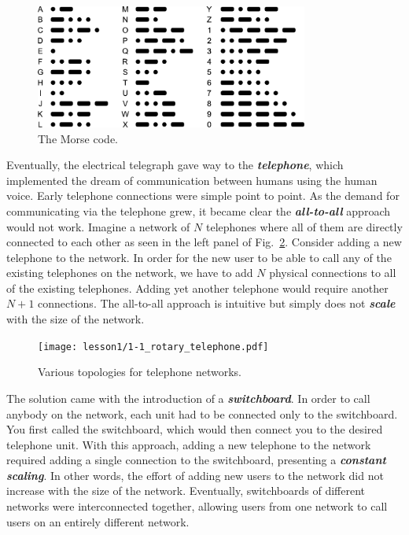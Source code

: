 \begin{figure}[t]
    \centering
    \includegraphics[width=0.8\textwidth]{lesson1/1-1_morse.pdf}
    \caption{The Morse code.}
    \label{fig:1-1_morse}
\end{figure}

Eventually, the electrical telegraph gave way to the \textit{\textbf{telephone}}, which implemented the dream of communication between humans using the human voice.
Early telephone connections were simple point to point.
As the demand for communicating via the telephone grew, it became clear the \textit{\textbf{all-to-all}} approach would not work.
Imagine a network of $N$ telephones where all of them are directly connected to each other as seen in the left panel of Fig.~\ref{fig:1-1_telephone}.
Consider adding a new telephone to the network.
In order for the new user to be able to call any of the existing telephones on the network, we have to add $N$ physical connections to all of the existing telephones.
Adding yet another telephone would require another $N+1$ connections.
The all-to-all approach is intuitive but simply does not \textit{\textbf{scale}} with the size of the network.

\begin{figure}[h]
    \centering
    \texttt{[image: lesson1/1-1\_rotary\_telephone.pdf]}
    \caption[Telephone networks.]{Various topologies for telephone networks.}
    \label{fig:1-1_telephone}
\end{figure}

The solution came with the introduction of a \textit{\textbf{switchboard}}.
In order to call anybody on the network, each unit had to be connected only to the switchboard.
You first called the switchboard, which would then connect you to the desired telephone unit.
With this approach, adding a new telephone to the network required adding a single connection to the switchboard, presenting a \textit{\textbf{constant scaling}}.
In other words, the effort of adding new users to the network did not increase with the size of the network.
Eventually, switchboards of different networks were interconnected together, allowing users from one network to call users on an entirely different network.

